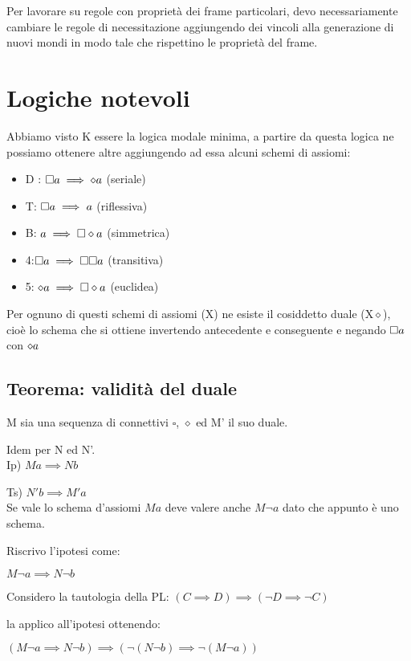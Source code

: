Per lavorare su regole con proprietà dei frame particolari, devo necessariamente
cambiare le regole di necessitazione aggiungendo dei vincoli alla
generazione di nuovi mondi in modo tale che rispettino le proprietà
del frame.


\section{Logiche notevoli}

Abbiamo visto K essere la logica modale minima, a partire da questa
logica ne possiamo ottenere altre aggiungendo ad essa alcuni schemi
di assiomi:
\begin{itemize}
\item D : $\square a\implies\diamond a$ (seriale)
\item T: $\square a\implies a$ (riflessiva)
\item B: $a\implies\square\diamond a$ (simmetrica)
\item 4:$\square a\implies\square\square a$ (transitiva)
\item 5: $\diamond a\implies\square\diamond a$ (euclidea)
\end{itemize}
Per ognuno di questi schemi di assiomi (X) ne esiste il cosiddetto
duale (X$\diamond$), cioè lo schema che si ottiene invertendo antecedente
e conseguente e negando $\square a$ con $\diamond a$


\subsection{Teorema: validità del duale }

M sia una sequenza di connettivi $\square$, $\diamond$ ed M' il
suo duale.

Idem per N ed N'.\\


Ip) $Ma\implies Nb$

Ts) $N'b\implies M'a$\\


Se vale lo schema d'assiomi $Ma$ deve valere anche $M\neg a$ dato
che appunto è uno schema.

Riscrivo l'ipotesi come:

$M\neg a\implies N\neg b$

Considero la tautologia della PL: $(C\implies D)\implies(\neg D\implies\neg C)$

la applico all'ipotesi ottenendo:

$(M\neg a\implies N\neg b)\implies(\neg(N\neg b)\implies\neg(M\neg a))$

